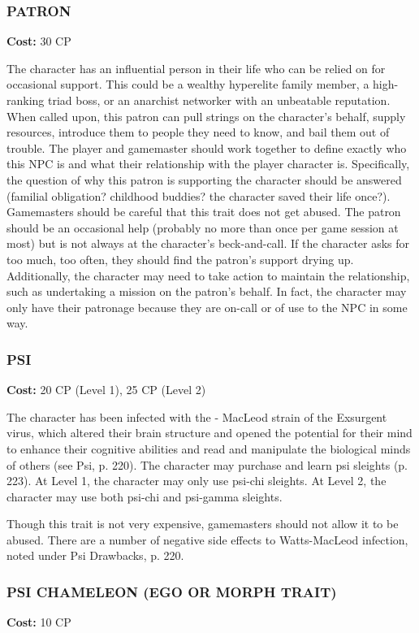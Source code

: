 \subsubsection{PATRON}
\textbf{Cost:} 30 CP

The character has an influential person in their life who can be relied on for
occasional support.  This could be a wealthy hyperelite family member, a
high-ranking triad boss, or an anarchist networker with an unbeatable
reputation. When called upon, this patron can pull strings on the character’s
behalf, supply resources, introduce them to people they need to know, and bail
them out of trouble. The player and gamemaster should work together to define
exactly who this NPC is and what their relationship with the player character
is. Specifically, the question of why this patron is supporting the character
should be answered (familial obligation? childhood buddies?  the character
saved their life once?). Gamemasters should be careful that this trait does not
get abused.  The patron should be an occasional help (probably no more than
once per game session at most) but is not always at the character’s
beck-and-call. If the character asks for too much, too often, they should find
the patron’s support drying up. Additionally, the character may need to take
action to maintain the relationship, such as undertaking a mission on the
patron’s behalf. In fact, the character may only have their patronage because
they are on-call or of use to the NPC in some way.

\subsubsection{PSI}
\textbf{Cost:} 20 CP (Level 1), 25 CP (Level 2)

The character has been infected with the - MacLeod strain of the Exsurgent
virus, which altered their brain structure and opened the potential for their
mind to enhance their cognitive abilities and read and manipulate the
biological minds of others (see Psi, p. 220). The character may purchase and
learn psi sleights (p. 223). At Level 1, the character may only use psi-chi
sleights. At Level 2, the character may use both psi-chi and psi-gamma
sleights.

Though this trait is not very expensive, gamemasters should not allow it to be
abused. There are a number of negative side effects to Watts-MacLeod infection,
noted under Psi Drawbacks, p. 220.

\subsubsection{PSI CHAMELEON (EGO OR MORPH TRAIT)}
\textbf{Cost:} 10 CP

